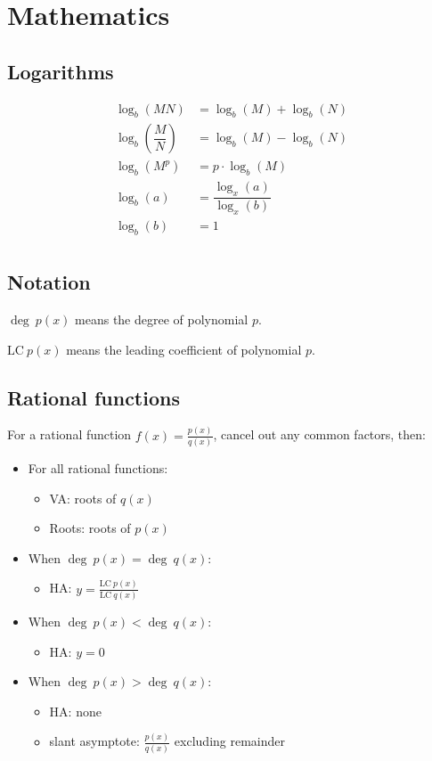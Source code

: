 \chapter{Mathematics}

\section{Logarithms}

\[\begin{aligned}
	\log_b(MN)&=\log_b(M)+\log_b(N) \\
	\log_b\left(\dfrac{M}{N}\right)&=\log_b(M)-\log_b(N) \\
	\log_b(M^p)&=p\cdot\log_b(M) \\
	\log_{b}(a)&=\dfrac{\log_{x}(a)}{\log_{x}(b)} \\
	\log_b(b)&=1 \\
\end{aligned}\]

\section{Notation}

$\deg~p(x)$ means the degree of polynomial $p$.

$\text{LC}~p(x)$ means the leading coefficient of polynomial $p$.

\section{Rational functions}

For a rational function $f(x) = \frac{p(x)}{q(x)}$, cancel out any common factors, then:

\begin{itemize}
	\item For all rational functions:
	\begin{itemize}
		\item VA: roots of $q(x)$
		\item Roots: roots of $p(x)$
	\end{itemize}
	\item When $\deg~p(x) = \deg~q(x)$:
	\begin{itemize}
		\item HA: $y = \frac{\text{LC}~p(x)}{\text{LC}~q(x)}$
	\end{itemize}
	\item When $\deg~p(x) < \deg~q(x)$:
	\begin{itemize}
		\item HA: $y = 0$
	\end{itemize}
	\item When $\deg~p(x) > \deg~q(x)$:
	\begin{itemize}
		\item HA: none
		\item slant asymptote: $\frac{p(x)}{q(x)}$ excluding remainder
	\end{itemize}
\end{itemize}

